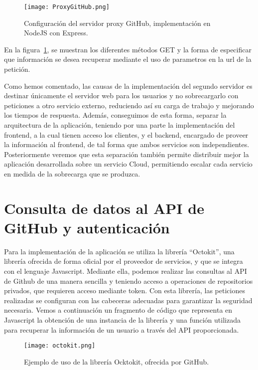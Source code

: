 \begin{figure}[h!]
  \texttt{[image: ProxyGitHub.png]}
  \caption{Configuración del servidor proxy GitHub, implementación en
    NodeJS con Express.}
  \label{figure:ProxyGitHub}
\end{figure}

En la figura~\ref{figure:ProxyGitHub}, se muestran los diferentes métodos
GET y la forma de especificar que información se desea recuperar mediante
el uso de parametros en la url de la petición.


Como hemos comentado, las causas de la implementación del segundo servidor
es destinar únicamente el servidor web para los usuarios y no sobrecargarlo
con peticiones a otro servicio externo, reduciendo así su carga de trabajo
y mejorando los tiempos de respuesta. Además, conseguimos de esta forma,
separar la arquitectura de la aplicación, teniendo por una parte la
implementación del frontend, a la cual tienen acceso los clientes, y el
backend, encargado de proveer la información al frontend, de tal forma que
ambos servicios son independientes.
Posteriormente veremos que esta separación también permite distribuir mejor
la aplicación desarrollada sobre un servicio Cloud, permitiendo escalar
cada servicio en medida de la sobrecarga que se produzca.


\section{Consulta de datos al API de GitHub y autenticación}

Para la implementación de la aplicación se utiliza la librería
“Octokit”, una librería ofrecida de forma oficial
por el proveedor de servicios, y que se integra con el lenguaje Javascript.
Mediante ella, podemos realizar las consultas al API de Github de una
manera sencilla y teniendo acceso a operaciones de repositorios privados,
que requieren acceso mediante token. Con esta librería, las peticiones
realizadas se configuran con las cabeceras adecuadas para garantizar la
seguridad necesaria. Vemos a continuación un fragmento de código que
representa en Javascript la obtención de una instancia de la librería y una
función utilizada para recuperar la información de un usuario a través del
API proporcionada.


\begin{figure}[h!]
  \centerline{\texttt{[image: octokit.png]}}
  \caption{Ejemplo de uso de la librería Ocktokit, ofrecida por GitHub.}
  \label{figure:octokit}
\end{figure}

